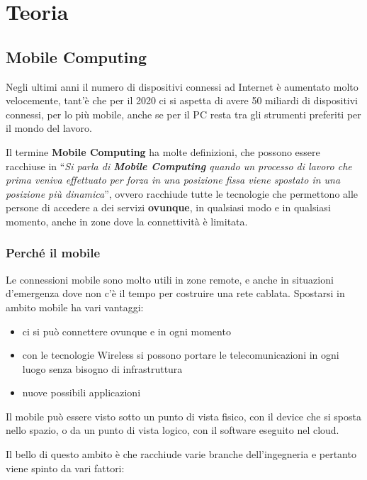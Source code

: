 \part{Teoria}

\chapter{Mobile Computing}
\label{mobile-computing}

Negli ultimi anni il numero di dispositivi connessi ad Internet è
aumentato molto velocemente, tant'è che per il 2020 ci si aspetta di
avere 50 miliardi di dispositivi connessi, per lo più mobile, anche se
per il PC resta tra gli strumenti preferiti per il mondo del lavoro.

Il termine \textbf{Mobile Computing} ha molte definizioni, che possono
essere racchiuse in ``\emph{Si parla di \textbf{Mobile Computing} quando
un processo di lavoro che prima veniva effettuato per forza in una
posizione fissa viene spostato in una posizione più dinamica}'', ovvero
racchiude tutte le tecnologie che permettono alle persone di accedere a
dei servizi \textbf{ovunque}, in qualsiasi modo e in qualsiasi momento, anche
in zone dove la connettività è limitata.

\section{Perché il mobile}

Le connessioni mobile sono molto utili in zone remote, e
anche in situazioni d'emergenza dove non c'è il tempo per costruire una rete
cablata.
Spostarsi in ambito mobile ha vari vantaggi:

\begin{itemize}
\item ci si può connettere ovunque e in ogni momento
\item con le tecnologie Wireless si possono portare le telecomunicazioni in
  ogni luogo senza bisogno di infrastruttura
\item nuove possibili applicazioni
\end{itemize}

Il mobile può essere visto sotto un punto di vista fisico, con il
device che si sposta nello spazio, o da un punto di vista logico, con il
software eseguito nel cloud.

Il bello di questo ambito è che racchiude varie branche dell'ingegneria
e pertanto viene spinto da vari fattori:

